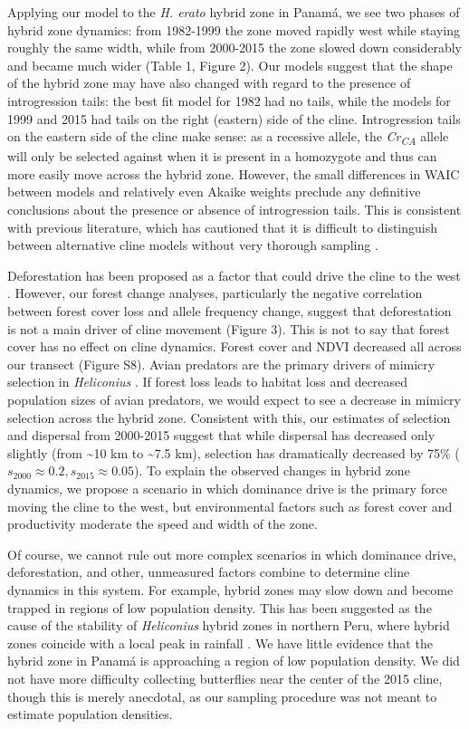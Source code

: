 \documentclass[]{article}
\begin{document}
Applying our model to the \textit{H. erato} hybrid zone in Panamá, we
see two phases of hybrid zone dynamics: from 1982-1999 the zone moved
rapidly west while staying roughly the same width, while from 2000-2015
the zone slowed down considerably and became much wider (Table 1, Figure
2). Our models suggest that the shape of the hybrid zone may have also
changed with regard to the presence of introgression tails: the best fit
model for 1982 had no tails, while the models for 1999 and 2015 had
tails on the right (eastern) side of the cline. Introgression tails on
the eastern side of the cline make sense: as a recessive allele, the
\textit{Cr\textsubscript{CA}} allele will only be selected against when
it is present in a homozygote and thus can more easily move across the
hybrid zone. However, the small differences in WAIC between models and
relatively even Akaike weights preclude any definitive conclusions about
the presence or absence of introgression tails. This is consistent with
previous literature, which has cautioned that it is difficult to
distinguish between alternative cline models without very thorough
sampling \citep{Barton:1993vy}.

Deforestation has been proposed as a factor that could drive the cline
to the west \citep{Blum:2002wr}. However, our forest change analyses,
particularly the negative correlation between forest cover loss and
allele frequency change, suggest that deforestation is not a main driver
of cline movement (Figure 3). This is not to say that forest cover has
no effect on cline dynamics. Forest cover and NDVI decreased all across
our transect (Figure S8). Avian predators are the primary drivers of
mimicry selection in \textit{Heliconius}
\citep{Pinheiro:1996ue, Pinheiro:2011fw}. If forest loss leads to
habitat loss and decreased population sizes of avian predators, we would
expect to see a decrease in mimicry selection across the hybrid zone.
Consistent with this, our estimates of selection and dispersal from
2000-2015 suggest that while dispersal has decreased only slightly (from
\textasciitilde{}10 km to \textasciitilde{}7.5 km), selection has
dramatically decreased by 75\%
(\(s_{2000} \approx 0.2, s_{2015} \approx 0.05\)). To explain the
observed changes in hybrid zone dynamics, we propose a scenario in which
dominance drive is the primary force moving the cline to the west, but
environmental factors such as forest cover and productivity moderate the
speed and width of the zone.

Of course, we cannot rule out more complex scenarios in which dominance
drive, deforestation, and other, unmeasured factors combine to determine
cline dynamics in this system. For example, hybrid zones may slow down
and become trapped in regions of low population density. This has been
suggested as the cause of the stability of \textit{Heliconius} hybrid
zones in northern Peru, where hybrid zones coincide with a local peak in
rainfall \citep{Rosser:2014bg}. We have little evidence that the hybrid
zone in Panamá is approaching a region of low population density. We did
not have more difficulty collecting butterflies near the center of the
2015 cline, though this is merely anecdotal, as our sampling procedure
was not meant to estimate population densities.
\end{document}
